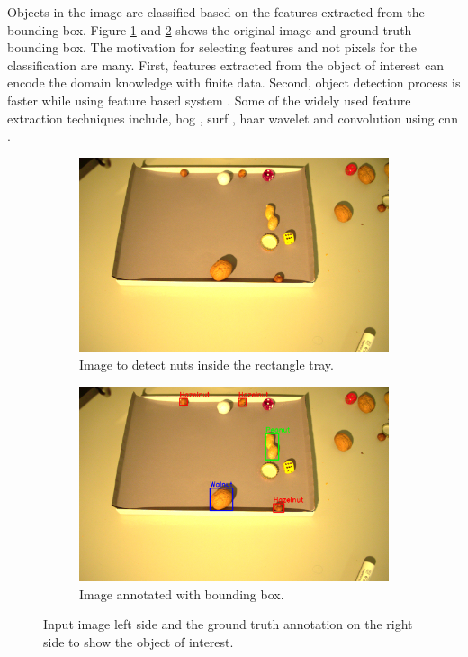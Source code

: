\documentclass[journal,onecolumn,12pt]{IEEEtran}
\begin{document}
Objects in the image are classified based on the features extracted from the bounding box. Figure \ref{fig:original_image_73} and \ref{fig:annotated_image_73_bb} shows the original image and ground truth bounding box. The motivation for selecting features and not pixels for the classification are many. First, features extracted from the object of interest can encode the domain knowledge with finite data. Second, object detection process is faster while using feature based system \cite{Viola2001}. Some of the widely used feature extraction techniques include, \gls{hog} \cite{Dalal2005}, \gls{surf} \cite{Herbert2006}, haar wavelet \cite{Viola2001} and convolution using \gls{cnn} \cite{Alex2012}.
\begin{figure}
   	\centering
   	\begin{subfigure}[b]{0.475\textwidth}
   		\centering
   		\includegraphics[width=\textwidth]{images/original_image_73}
   		\caption{Image to detect nuts inside the rectangle tray.}
   		\label{fig:original_image_73}
   	\end{subfigure}
   	\hfill
   	\begin{subfigure}[b]{0.475\textwidth}  
   		\centering 
   		\includegraphics[width=\textwidth]{images/annotated_image_73_bb}
   		\caption{Image annotated with bounding box.}   
   		\label{fig:annotated_image_73_bb}
   	\end{subfigure}
   	\caption{Input image left side and the ground truth annotation on the right side to show the object of interest.}
   	\label{fig:ground_truth}
\end{figure}
\end{document}
